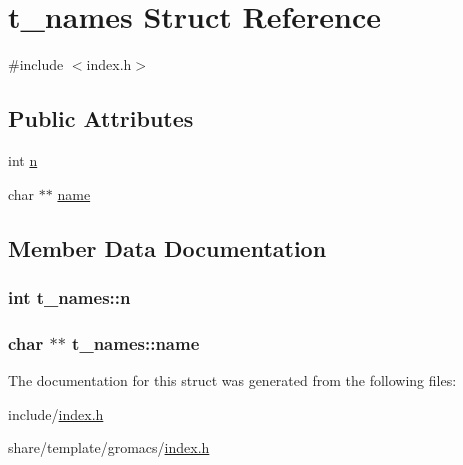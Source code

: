 \hypertarget{structt__names}{\section{t\-\_\-names \-Struct \-Reference}
\label{structt__names}
}


{\ttfamily \#include $<$index.\-h$>$}

\subsection*{\-Public \-Attributes}
\begin{DoxyCompactItemize}
\item 
int \hyperlink{structt__names_ae2570285c238efd8c158d7c4465f1730}{n}
\item 
char $\ast$$\ast$ \hyperlink{structt__names_a4ad2c7cb00b4c71be5124955f5590486}{name}
\end{DoxyCompactItemize}


\subsection{\-Member \-Data \-Documentation}
\hypertarget{structt__names_ae2570285c238efd8c158d7c4465f1730}{
\subsubsection[{n}]{\setlength{\rightskip}{0pt plus 5cm}int {\bf t\-\_\-names\-::n}}}\label{structt__names_ae2570285c238efd8c158d7c4465f1730}
\hypertarget{structt__names_a4ad2c7cb00b4c71be5124955f5590486}{
\subsubsection[{name}]{\setlength{\rightskip}{0pt plus 5cm}char $\ast$$\ast$ {\bf t\-\_\-names\-::name}}}\label{structt__names_a4ad2c7cb00b4c71be5124955f5590486}


\-The documentation for this struct was generated from the following files\-:\begin{DoxyCompactItemize}
\item 
include/\hyperlink{include_2index_8h}{index.\-h}\item 
share/template/gromacs/\hyperlink{share_2template_2gromacs_2index_8h}{index.\-h}\end{DoxyCompactItemize}
